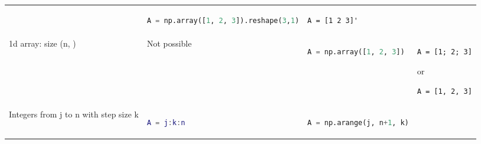 \documentclass[10pt, landscape]{article}
\begin{document}
\begin{multicols}{2}
\begin{tabular}[]{@{}llll@{}}
\begin{minipage}[t]{0.19\columnwidth}
\end{minipage} & \begin{minipage}[t]{0.29\columnwidth}\raggedright
\begin{lstlisting}[language=Python]
A = np.array([1, 2, 3]).reshape(3,1)
\end{lstlisting}

\end{minipage} & \begin{minipage}[t]{0.19\columnwidth}\raggedright
\begin{lstlisting}
A = [1 2 3]'
\end{lstlisting}

\end{minipage}\tabularnewline
\begin{minipage}[t]{0.21\columnwidth}\raggedright
1d array: size (n, )
\end{minipage} & \begin{minipage}[t]{0.19\columnwidth}\raggedright
Not possible
\end{minipage} & \begin{minipage}[t]{0.29\columnwidth}\raggedright
\begin{lstlisting}[language=Python]
A = np.array([1, 2, 3])
\end{lstlisting}

\end{minipage} & \begin{minipage}[t]{0.19\columnwidth}\raggedright
\begin{lstlisting}
A = [1; 2; 3]
\end{lstlisting}

or

\begin{lstlisting}
A = [1, 2, 3]
\end{lstlisting}

\end{minipage}\tabularnewline
\begin{minipage}[t]{0.21\columnwidth}\raggedright
Integers from j to n with step size k
\end{minipage} & \begin{minipage}[t]{0.19\columnwidth}\raggedright
\begin{lstlisting}[language=Matlab]
A = j:k:n
\end{lstlisting}

\end{minipage} & \begin{minipage}[t]{0.29\columnwidth}\raggedright
\begin{lstlisting}[language=Python]
A = np.arange(j, n+1, k)
\end{lstlisting}


\end{minipage}
\end{tabular}
\end{multicols}
\end{document}
